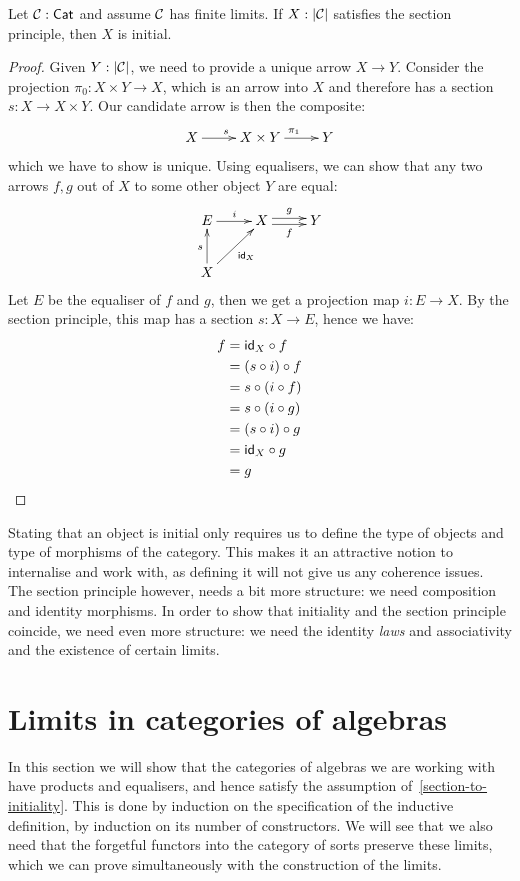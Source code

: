 \begin{lemma}
  \label{section-to-initiality}
  Let $\mathcal{C}: \mathsf{Cat}$ and assume $\mathcal{C}$ has finite limits. If $X : | \mathcal{C} |$
  satisfies the section principle, then $X$ is initial.
\end{lemma}
\begin{proof}
  Given $Y : |\mathcal{C}|$, we need to provide a unique arrow $X \to
  Y$. Consider the projection $\pi_0 : X \times Y \to X$, which is an
  arrow into $X$ and therefore has a section $s : X \to X \times
  Y$. Our candidate arrow is then the composite:
  $$
  \xymatrix{
    X \ar[r]^{s} &X \times Y \ar[r]^{\pi_1} &Y
  }
  $$
  which we have to show is unique. Using equalisers, we can show that
  any two arrows $f,g$ out of $X$ to some other object $Y$ are equal:
  \[
    \xymatrix{
      E \ar[r]^{i} &X \ar@<-.5ex>[r]_-{f} \ar@<.5ex>[r]^-{g} &Y \\
      X \ar[u]^{s} \ar[ur]_{\id_{X}}
    }
  \]
  Let $E$ be the equaliser of $f$ and $g$, then we get a projection map
  $i : E \to X$. By the section principle, this map has a section
  $s : X \to E$, hence we have:
  \begin{align*}
    f &= \mathsf{id}_X \circ f \\
      &= (s \circ i) \circ f \\
      &= s \circ (i \circ f) \\
      &= s \circ (i \circ g) \\
      &= (s \circ i) \circ g \\
      &= \mathsf{id}_X \circ g \\
      &= g
  \end{align*}
\end{proof}

Stating that an object is initial only requires us to define the type
of objects and type of morphisms of the category. This makes it an
attractive notion to internalise and work with, as defining it will
not give us any coherence issues. The section principle however, needs
a bit more structure: we need composition and identity morphisms. In
order to show that initiality and the section principle coincide, we
need even more structure: we need the identity \emph{laws} and
associativity and the existence of certain limits.

\section{Limits in categories of algebras}

In this section we will show that the categories of algebras we are
working with have products and equalisers, and hence satisfy the
assumption of~\cref{section-to-initiality}. This is done by induction
on the specification of the inductive definition, \ie by induction on
its number of constructors. We will see that we also need that the
forgetful functors into the category of sorts preserve these limits,
which we can prove simultaneously with the construction of the limits.


